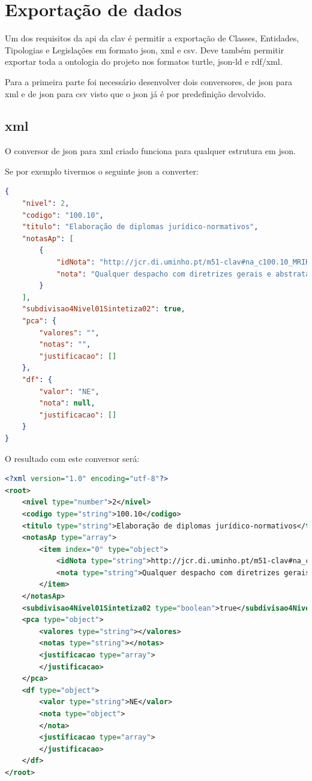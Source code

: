 \section{Exportação de dados}
Um dos requisitos da \acrshort{api} da \acrshort{clav} é permitir a exportação de Classes, Entidades, Tipologias e Legislações em formato \acrshort{json}, \acrshort{xml} e \acrshort{csv}. Deve também permitir exportar toda a ontologia do projeto nos formatos \acrshort{turtle}, \acrshort{json-ld} e \acrshort{rdf}/\acrshort{xml}.

Para a primeira parte foi necessário desenvolver dois conversores, de \acrshort{json} para \acrshort{xml} e de \acrshort{json} para \acrshort{csv} visto que o \acrshort{json} já é por predefinição devolvido.

\subsection{\acrshort{xml}}
O conversor de \acrshort{json} para \acrshort{xml} criado funciona para qualquer estrutura em \acrshort{json}.

Se por exemplo tivermos o seguinte \acrshort{json} a converter:
\begin{lstlisting}[language=json, caption=\acrshort{json} exemplo a converter, label=exem:json]
{
    "nivel": 2,
    "codigo": "100.10",
    "titulo": "Elaboração de diplomas jurídico-normativos",
    "notasAp": [
        {
            "idNota": "http://jcr.di.uminho.pt/m51-clav#na_c100.10_MRIKl-RBu_2sz5u9FzPqH",
            "nota": "Qualquer despacho com diretrizes gerais e abstratas"
        }
    ],
    "subdivisao4Nivel01Sintetiza02": true,
    "pca": {
        "valores": "",
        "notas": "",
        "justificacao": []
    },
    "df": {
        "valor": "NE",
        "nota": null,
        "justificacao": []
    }
}
\end{lstlisting}

O resultado com este conversor será:
\begin{lstlisting}[language=xml, caption=\acrshort{xml} resultante da conversão do \acrshort{json} presente em~\ref{exem:json}]
<?xml version="1.0" encoding="utf-8"?>
<root>
    <nivel type="number">2</nivel>
    <codigo type="string">100.10</codigo>
    <titulo type="string">Elaboração de diplomas jurídico-normativos</titulo>
    <notasAp type="array">
        <item index="0" type="object">
            <idNota type="string">http://jcr.di.uminho.pt/m51-clav#na_c100.10_MRIKl-RBu_2sz5u9FzPqH</idNota>
            <nota type="string">Qualquer despacho com diretrizes gerais e abstratas</nota>
        </item>
    </notasAp>
    <subdivisao4Nivel01Sintetiza02 type="boolean">true</subdivisao4Nivel01Sintetiza02>
    <pca type="object">
        <valores type="string"></valores>
        <notas type="string"></notas>
        <justificacao type="array">
        </justificacao>
    </pca>
    <df type="object">
        <valor type="string">NE</valor>
        <nota type="object">
        </nota>
        <justificacao type="array">
        </justificacao>
    </df>
</root>
\end{lstlisting}

